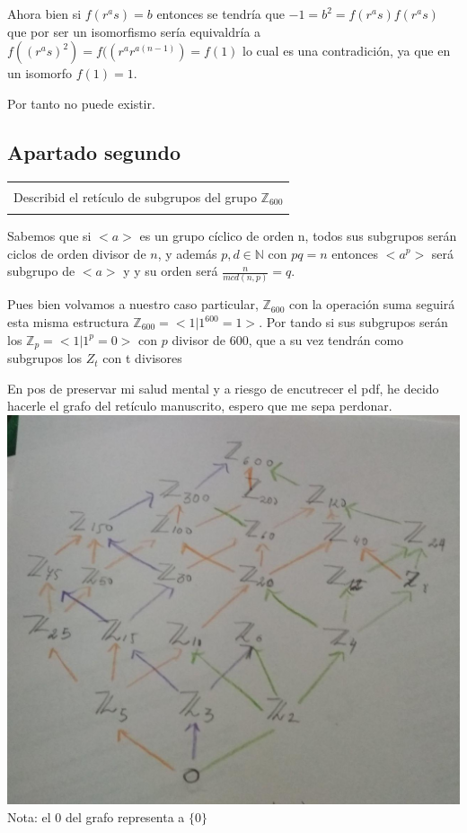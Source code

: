 \documentclass[12pt]{article}
\newenvironment{micaja}
{
    \begin{center}
    \begin{tabular}{|p{0.9\textwidth}|}
    \hline\\
    }   
    {   
    \\\\\hline
    \end{tabular} 
    \end{center}
    }
\begin{document}
Ahora bien si $f(r^a s) = b$ entonces se tendría que $-1 = b^2 = f(r^a s) f(r^a s)$ 
que por ser un isomorfismo sería equivaldría a $f((r^a s)^2) =f((r^a r^{a(n-1)}) = f(1)$
lo cual es una contradición, ya que en un isomorfo $f(1)=1.$

Por tanto no puede existir.

\subsection{Apartado segundo}
\begin{micaja}
    Describid el retículo de subgrupos del grupo $\mathbb Z _{600}$
\end{micaja}


Sabemos que si $<a>$ es un grupo cíclico de orden n, todos sus subgrupos serán ciclos de orden
divisor de $n$, y además  $p,d \in \mathbb N$ con $pq=n$ entonces $<a^p>$ será subgrupo de $<a>$ y 
y su orden será $\frac{n}{mcd(n,p)} = q.$

Pues bien volvamos a nuestro caso particular, $\mathbb Z_{600}$ con la operación suma seguirá esta misma estructura
 $\mathbb Z_{600} = <1 | 1^{600} = 1>$. 
Por tando si sus subgrupos serán los  $\mathbb Z_{p} = <1 | 1^p = 0>$ con $p$ divisor de 600, que a su vez
tendrán como subgrupos los $Z_{t}$ con t divisores  

En pos de preservar mi salud mental y a riesgo de encutrecer el pdf, he decido hacerle el grafo del retículo
manuscrito, espero que me sepa perdonar. 
\includegraphics[width=\textwidth]{Z600}
Nota: el $0$ del grafo representa a $\{0\}$
\end{document}
